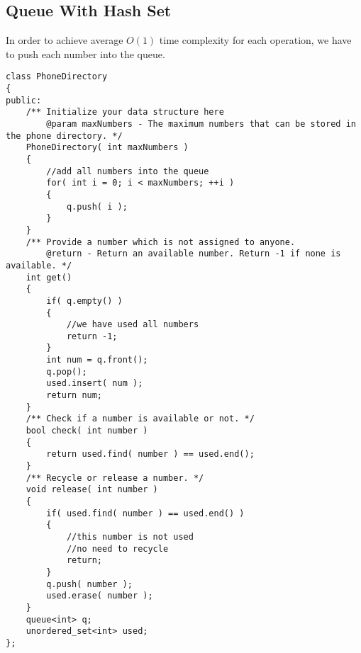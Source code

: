 \subsection{Queue With Hash Set}
In order to achieve average $O(1)$ time complexity for each operation, we have to push each number into the queue.

\setcounter{lstlisting}{0}
\begin{lstlisting}[style=customc, caption={Queue}]
class PhoneDirectory
{
public:
    /** Initialize your data structure here
        @param maxNumbers - The maximum numbers that can be stored in the phone directory. */
    PhoneDirectory( int maxNumbers )
    {
        //add all numbers into the queue
        for( int i = 0; i < maxNumbers; ++i )
        {
            q.push( i );
        }
    }
    /** Provide a number which is not assigned to anyone.
        @return - Return an available number. Return -1 if none is available. */
    int get()
    {
        if( q.empty() )
        {
            //we have used all numbers
            return -1;
        }
        int num = q.front();
        q.pop();
        used.insert( num );
        return num;
    }
    /** Check if a number is available or not. */
    bool check( int number )
    {
        return used.find( number ) == used.end();
    }
    /** Recycle or release a number. */
    void release( int number )
    {
        if( used.find( number ) == used.end() )
        {
            //this number is not used
            //no need to recycle
            return;
        }
        q.push( number );
        used.erase( number );
    }
    queue<int> q;
    unordered_set<int> used;
};
\end{lstlisting} 